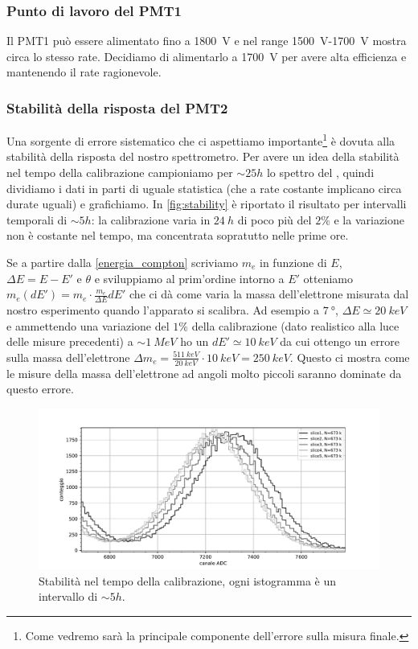 \subsubsection{Punto di lavoro del PMT1}
Il PMT1 può essere alimentato fino a \SI{1800}{V} e nel range \SI{1500}{V}-\SI{1700}{V} mostra circa lo stesso rate. Decidiamo di alimentarlo a \SI{1700}{V} per avere alta efficienza e mantenendo il rate ragionevole.

\subsubsection{Stabilità della risposta del PMT2}
Una sorgente di errore sistematico che ci aspettiamo importante\footnote{Come vedremo sarà la principale componente dell'errore sulla misura finale.} è dovuta alla stabilità della risposta del nostro spettrometro. Per avere un idea della stabilità nel tempo della calibrazione campioniamo per $\sim{25}{h}$ lo spettro del \co, quindi dividiamo i dati in parti di uguale statistica (che a rate costante implicano circa durate uguali) e grafichiamo. In \autoref{fig:stability} è riportato il risultato per intervalli temporali di $\sim{5}{h}$: la calibrazione varia in $\SI{24}{h}$ di poco più del $2\%$ e la variazione non è costante nel tempo, ma concentrata sopratutto nelle prime ore. 

Se a partire dalla \autoref{energia_compton} scriviamo $m_e$ in funzione di $E$, $\Delta E = E-E'$ e $\theta$ e sviluppiamo al prim'ordine intorno a $E'$ otteniamo $m_e(dE') = m_e \cdot \frac{m_e}{\Delta E}dE'$ che ci dà come varia la massa dell'elettrone misurata dal nostro esperimento quando l'apparato si scalibra. Ad esempio a $\SI{7}{\degree}$, $\Delta E \simeq \SI{20}{keV}$ e ammettendo una variazione del $1\%$ della calibrazione (dato realistico alla luce delle misure precedenti) a $\sim\SI{1}{MeV}$ ho un $dE' \simeq \SI{10}{keV}$ da cui ottengo un errore sulla massa dell'elettrone $\Delta m_e = \frac{\SI{511}{keV}}{\SI{20}{keV}} \cdot  \SI{10}{keV} = \SI{250}{keV}$. Questo ci mostra come le misure della massa dell'elettrone ad angoli molto piccoli saranno dominate da questo errore.

 \begin{figure}[h]
	\hspace{-4em}
	\includegraphics[width=45em]{stability}
	\caption{\label{fig:stability}Stabilità nel tempo della calibrazione, ogni istogramma è un intervallo di $\sim{5}{h}$.}
\end{figure}

